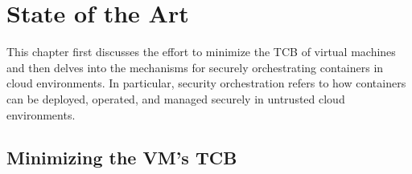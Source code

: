 \chapter{State of the Art}
\label{see:art}








This chapter first discusses the effort to minimize the \acrshort{TCB} of virtual machines and then delves into the mechanisms for securely orchestrating containers in cloud environments. In particular, security orchestration refers to how containers can be deployed, operated, and managed securely in untrusted cloud environments.


\section{Minimizing the VM's TCB}

